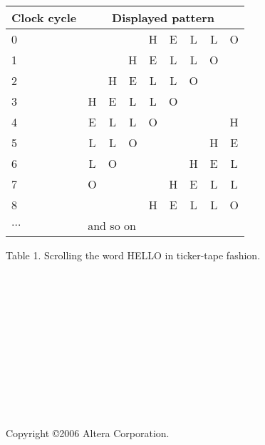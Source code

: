 \documentclass[psfig,10pt,fullpage]{article}
\begin{document}
~\\
\begin{center}
\begin{tabular}{l|cccccccc}
Clock cycle & \multicolumn{8}{c}{Displayed pattern} \\
\hline
\hspace{8.0 mm} {\rule[0mm]{0mm}{5mm}0} &  &  &  & H & E & L & L & O\\ 
\hspace{8.0 mm} 1 &  &  & H & E & L & L & O & \\
\hspace{8.0 mm} 2 &  & H & E & L & L & O &  & \\
\hspace{8.0 mm} 3 & H & E & L & L & O &  &  & \\
\hspace{8.0 mm} 4 & E & L & L & O &  &  &  & H\\
\hspace{8.0 mm} 5 & L & L & O &  &  &  & H & E\\
\hspace{8.0 mm} 6 & L & O &  &  &  & H & E & L\\
\hspace{8.0 mm} 7 & O &  &  &  & H & E & L & L\\
\hspace{8.0 mm} 8 &  &  &  & H & E & L & L & O\\
\hspace{8.0 mm} $\ldots$ & \multicolumn{8}{l}{and so on}\\
\end{tabular}
\end{center}

\begin{center}
Table 1. Scrolling the word HELLO in ticker-tape fashion.
\end{center}
~\\
~\\
~\\
~\\
~\\
~\\
~\\
~\\
~\\
~\\
~\\
Copyright \copyright 2006 Altera Corporation. 
\end{document}
